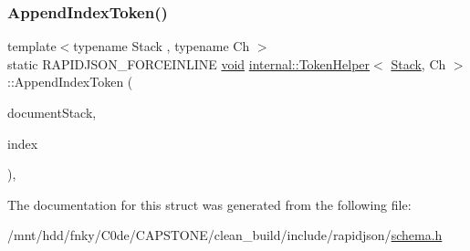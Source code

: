 \subsubsection{\texorpdfstring{Append\+Index\+Token()}{AppendIndexToken()}}
{\footnotesize\ttfamily template$<$typename Stack , typename Ch $>$ \\
static R\+A\+P\+I\+D\+J\+S\+O\+N\+\_\+\+F\+O\+R\+C\+E\+I\+N\+L\+I\+NE \hyperlink{imgui__impl__opengl3__loader_8h_ac668e7cffd9e2e9cfee428b9b2f34fa7}{void} \hyperlink{structinternal_1_1TokenHelper}{internal\+::\+Token\+Helper}$<$ \hyperlink{classinternal_1_1Stack}{Stack}, Ch $>$\+::Append\+Index\+Token (\begin{DoxyParamCaption}\item[{\hyperlink{classinternal_1_1Stack}{Stack} \&}]{document\+Stack,  }\item[{\hyperlink{rapidjson_8h_a5ed6e6e67250fadbd041127e6386dcb5}{Size\+Type}}]{index }\end{DoxyParamCaption})\hspace{0.3cm}{\ttfamily [inline]}, {\ttfamily [static]}}



The documentation for this struct was generated from the following file\+:\begin{DoxyCompactItemize}
\item 
/mnt/hdd/fnky/\+C0de/\+C\+A\+P\+S\+T\+O\+N\+E/clean\+\_\+build/include/rapidjson/\hyperlink{schema_8h}{schema.\+h}\end{DoxyCompactItemize}
